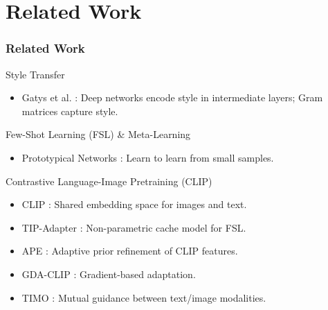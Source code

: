 \documentclass{beamer}
\begin{document}
\section{Related Work}
\begin{frame}
  \frametitle{Related Work}
  \begin{block}{Style Transfer}
    \begin{itemize}
        \item Gatys et al. \cite{StyleTransfer}: Deep networks encode style in intermediate layers; Gram matrices capture style.
    \end{itemize}
  \end{block}

  \begin{block}{Few-Shot Learning (FSL) \& Meta-Learning}
    \begin{itemize}
        \item Prototypical Networks \cite{ProtoNet}: Learn to learn from small samples.
    \end{itemize}
  \end{block}

  \begin{block}{Contrastive Language-Image Pretraining (CLIP)}
    \begin{itemize}
        \item CLIP \cite{CLIP}: Shared embedding space for images and text.
        \item TIP-Adapter \cite{TipAdapter}: Non-parametric cache model for FSL.
        \item APE \cite{APE}: Adaptive prior refinement of CLIP features.
        \item GDA-CLIP \cite{GDA_CLIP}: Gradient-based adaptation.
        \item TIMO \cite{TIMO}: Mutual guidance between text/image modalities.
    \end{itemize}
  \end{block}
  \tiny
  \nocite{StyleTransfer,ProtoNet,CLIP,TipAdapter,APE,GDA_CLIP,TIMO} %
\end{frame}

\end{document}
